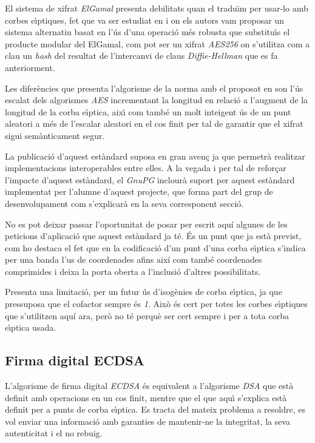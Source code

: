 \documentclass[12pt,twoside,catalan,a4paper]{book}%
\numberwithin{figure}{section}		%
\theoremstyle{definition}   			%
\def\ce{corba e\lgem{}\'{\i}ptica}%
\def\ces{corbes e\lgem{}\'{\i}ptiques}%
\def\cf{cos finit}%
\theoremstyle{saltolinea}   			%
\begin{document}
El sistema de xifrat \emph{ElGamal} presenta debilitats quan el tradu\"{\i}m per usar-lo amb \ces{}, fet que va ser estudiat en \cite{BM06} i on els autors vam proposar un sistema alternatiu basat en l'\'us d'una operaci\'o m\'es robusta que substitu\'{\i}s el producte modular del ElGamal, com pot ser un xifrat \emph{AES256} on s'utilitza com a clau un \emph{hash} del resultat de l'intercanvi de claus \emph{Diffie-Hellman} que es fa anteriorment.

Les difer\`encies que presenta l'algorisme de la norma \cite{ECPGP} amb el proposat en \cite{BM06} son l'\'us escalat dels algorismes \emph{AES} incrementant la longitud en relaci\'o a l'augment de la longitud de la \ce{}, aix\'{\i} com tamb\'e un molt inte\lgem{}igent \'us de un punt aleatori a m\'es de l'escalar aleatori en el \cf{} per tal de garantir que el xifrat sigui sem\`anticament segur.

La publicaci\'o d'aquest est\`andard suposa en gran aven\c{c} ja que permetr\`a realitzar implementacions interoperables entre elles. A la vegada i per tal de refor\c{c}ar l'impacte d'aquest est\`andard, el \emph{GnuPG} inclour\`a suport per aquest est\`andard implementat per l'alumne d'aquest projecte, que forma part del grup de desenvolupament com s'explicar\`a en la seva corresponent secci\'o.

No es pot deixar passar l'oportunitat de posar per escrit aqu\'i algunes de les peticions d'aplicaci\'o que aquest est\`andard ja t\'e. \'Es un punt que ja est\`a previst, com ho destaca el fet que en la codificaci\'o d'un punt d'una \ce{} s'indica per una banda l'us de coordenades afins aix\'i com tamb\'e coordenades comprimides i deixa la porta oberta a l'inclusi\'o d'altres possibilitats.

Presenta una limitaci\'o, per un futur \'us d'isog\`enies de \ce{}, ja que pressuposa que el cofactor sempre \'es \emph{1}. Aix\`o \'es cert per totes les \ces{} que s'utilitzen aqu\'i ara, per\`o no t\'e perqu\`e ser cert sempre i per a tota \ce{} usada.


\subsection{Firma digital ECDSA}

L'algorisme de firma digital \emph{ECDSA} \'es equivalent a l'algorisme \emph{DSA} que est\`a definit amb operacions en un \cf{}, mentre que el que aqu\'{\i} s'explica est\`a definit per a punts de \ce{}. Es tracta del mateix problema a resoldre, es vol enviar una informaci\'o amb garanties de mantenir-ne la integritat, la seva autenticitat i el no rebuig.
\end{document}
